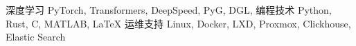

\begin{cvskills}
  \cvskill
    {深度学习} %
    {PyTorch, Transformers, DeepSpeed, PyG, DGL, } %
  \cvskill
    {编程技术} %
    {Python, Rust, C, MATLAB, LaTeX}
  \cvskill
    {运维支持}
    {Linux, Docker, LXD, Proxmox, Clickhouse, Elastic Search}

\end{cvskills}
